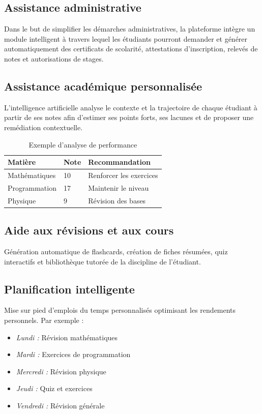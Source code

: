 \documentclass[12pt,a4paper]{report}
\begin{document}
\subsection{Assistance administrative}
Dans le but de simplifier les démarches administratives, la plateforme intègre un module intelligent à travers lequel les étudiants pourront demander et générer automatiquement des certificats de scolarité, attestations d'inscription, relevés de notes et autorisations de stages.

\subsection{Assistance académique personnalisée}
L'intelligence artificielle analyse le contexte et la trajectoire de chaque étudiant à partir de ses notes afin d'estimer ses points forts, ses lacunes et de proposer une remédiation contextuelle.

\begin{table}[H]
\centering
\begin{tabular}{@{}lll@{}}
\toprule
\textbf{Matière} & \textbf{Note} & \textbf{Recommandation} \\ \midrule
Mathématiques & 10 & Renforcer les exercices \\
Programmation & 17 & Maintenir le niveau \\
Physique & 9 & Révision des bases \\ \bottomrule
\end{tabular}
\caption{Exemple d'analyse de performance}
\end{table}

\subsection{Aide aux révisions et aux cours}
Génération automatique de flashcards, création de fiches résumées, quiz interactifs et bibliothèque tutorée de la discipline de l'étudiant.

\subsection{Planification intelligente}
Mise sur pied d'emplois du temps personnalisés optimisant les rendements personnels. Par exemple :
\begin{itemize}
    \item \textit{Lundi :} Révision mathématiques
    \item \textit{Mardi :} Exercices de programmation
    \item \textit{Mercredi :} Révision physique
    \item \textit{Jeudi :} Quiz et exercices
    \item \textit{Vendredi :} Révision générale
\end{itemize}
\end{document}
